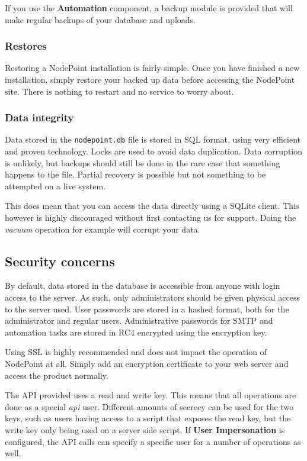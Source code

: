 \documentclass[11pt]{article}
\begin{document}
If you use the \textbf{Automation} component, a backup module is provided that will make regular backups of your database and uploads.

\subsubsection{Restores}
Restoring a NodePoint installation is fairly simple. Once you have finished a new installation, simply restore your backed up data before accessing the NodePoint site. There is nothing to restart and no service to worry about.

\subsubsection{Data integrity}
Data stored in the \texttt{nodepoint.db} file is stored in SQL format, using very efficient and proven technology. Locks are used to avoid data duplication. Data corruption is unlikely, but backups should still be done in the rare case that something happens to the file. Partial recovery is possible but not something to be attempted on a live system.

This does mean that you can access the data directly using a SQLite client. This however is highly discouraged without first contacting us for support. Doing the \textit{vacuum} operation for example will corrupt your data.

\subsection{Security concerns}
By default, data stored in the database is accessible from anyone with login access to the server. As such, only administrators should be given physical access to the server used. User passwords are stored in a hashed format, both for the administrator and regular users. Administrative passwords for SMTP and automation tasks are stored in RC4 encrypted using the encryption key.

Using SSL is highly recommended and does not impact the operation of NodePoint at all. Simply add an encryption certificate to your web server and access the product normally.

The API provided uses a read and write key. This means that all operations are done as a special \textit{api} user. Different amounts of secrecy can be used for the two keys, such as users having access to a script that exposes the read key, but the write key only being used on a server side script. If \textbf{User Impersonation} is configured, the API calls can specify a specific user for a number of operations as well.
\end{document}
